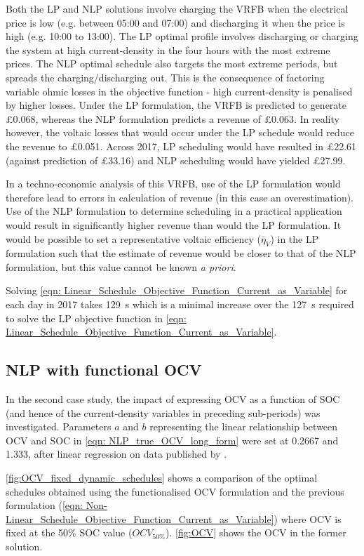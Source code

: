 \documentclass[preprint,3p,review,authoryear,10pt]{elsarticle}
\begin{document}
Both the LP and NLP solutions involve charging the VRFB when the electrical price is low (e.g. between 05:00 and 07:00) and discharging it when the price is high (e.g. 10:00 to 13:00). The LP optimal profile involves discharging or charging the system at high current-density in the four hours with the most extreme prices. The NLP optimal schedule also targets the most extreme periods, but spreads the charging/discharging out. This is the consequence of factoring variable ohmic losses in the objective function -   high current-density is penalised by higher losses. Under the LP formulation, the VRFB is predicted to generate \pounds 0.068, whereas the NLP formulation predicts a revenue of \pounds 0.063. In reality however, the voltaic losses that would occur under the LP schedule would reduce the revenue to \pounds 0.051. Across 2017, LP scheduling would have resulted in \pounds 22.61 (against prediction of \pounds 33.16) and NLP scheduling would have yielded \pounds 27.99.

In a techno-economic analysis of this VRFB, use of the LP formulation would therefore lead to errors in calculation of revenue (in this case an overestimation). Use of the NLP formulation to determine scheduling in a practical application would result in significantly higher revenue than would the LP formulation. It would be possible to set a representative voltaic efficiency ($\bar\eta_V$) in the LP formulation such that the estimate of revenue would be closer to that of the NLP formulation, but this value cannot be known \textit{a priori}.

Solving \cref{eqn: Linear_Schedule_Objective_Function_Current_as_Variable} for each day in 2017 takes \SI{129}{\second} which is a minimal increase over the \SI{127}{\second} required to solve the LP objective function in \cref{eqn: Linear_Schedule_Objective_Function_Current_as_Variable}.


\subsection{NLP with functional OCV}
\label{Results_NLP_Functional_OCV}
In the second case study, the impact of expressing OCV as a function of SOC (and hence of the current-density variables in preceding sub-periods) was investigated. Parameters $a$ and $b$ representing the linear relationship between OCV and SOC in \cref{eqn: NLP_true_OCV_long_form} were set at 0.2667 and 1.333, after linear regression on data published by \cite{Kim2011}. 

\cref{fig:OCV_fixed_dynamic_schedules} shows a comparison of the optimal schedules obtained using the functionalised OCV formulation and the previous formulation (\cref{eqn: Non-Linear_Schedule_Objective_Function_Current_as_Variable}) where OCV is fixed at the 50\% SOC value ($OCV_{50\%}$). \cref{fig:OCV} shows the OCV in the former solution.
\end{document}
